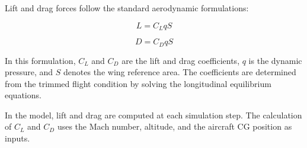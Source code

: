 Lift and drag forces follow the standard aerodynamic formulations:

\begin{equation}
L = C_L q S
\end{equation}

\begin{equation}
D = C_D q S
\end{equation}

In this formulation, \(C_L\) and \(C_D\) are the lift and drag coefficients, \(q\) is the dynamic pressure, and \(S\) denotes the wing reference area. The coefficients are determined from the trimmed flight condition by solving the longitudinal equilibrium equations.

In the model, lift and drag are computed at each simulation step. The calculation of \(C_L\) and \(C_D\) uses the Mach number, altitude, and the aircraft CG position as inputs.

